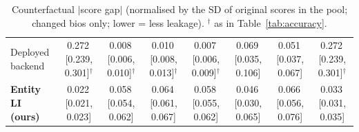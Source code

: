 \begin{table}[t]
{\begin{tabular}{lccccccc}
Deployed backend & 0.272\,{\scriptsize[0.239, 0.301]}$^{\dagger}$ & 0.008\,{\scriptsize[0.006, 0.010]}$^{\dagger}$ & 0.010\,{\scriptsize[0.008, 0.013]}$^{\dagger}$ & 0.007\,{\scriptsize[0.006, 0.009]}$^{\dagger}$ & 0.069\,{\scriptsize[0.035, 0.106]} & 0.051\,{\scriptsize[0.037, 0.067]} & 0.272\,{\scriptsize[0.239, 0.301]}$^{\dagger}$ \\
\textbf{Entity LI (ours)} & 0.022\,{\scriptsize[0.021, 0.023]} & 0.058\,{\scriptsize[0.054, 0.062]} & 0.064\,{\scriptsize[0.061, 0.067]} & 0.058\,{\scriptsize[0.055, 0.062]} & 0.046\,{\scriptsize[0.030, 0.065]} & 0.066\,{\scriptsize[0.056, 0.076]} & 0.033\,{\scriptsize[0.031, 0.035]} \\
\bottomrule
\end{tabular}
}
\caption{Counterfactual $|$score gap$|$ (normalised by the SD of original scores in the pool; changed bios only; lower = less leakage). $^\dagger$ as in Table~\ref{tab:accuracy}.}
\label{tab:fairness}
\end{table}

